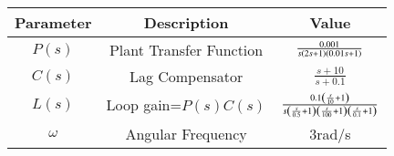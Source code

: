 \begin{tabular}{|c|c|c|}
\hline
    Parameter & Description & Value\\
    \hline
    $P(s)$ & Plant Transfer Function & $\frac{0.001}{s\left(2s+1\right)\left(0.01s+1\right)}$\\
    \hline
    $C(s)$ & Lag Compensator  & $\frac{s+10}{s+0.1}$\\
    \hline
    $L(s)$ & Loop gain=$P(s) C(s)$  & $\frac{0.1\left(\frac{s}{10}+1\right)}{s\left(\frac{s}{0.5}+1\right)\left(\frac{s}{100}+1\right)\left(\frac{s}{0.1}+1\right)}$ \\
    \hline
    $\omega$ & Angular Frequency & 3rad/s \\
    \hline
\end{tabular}
